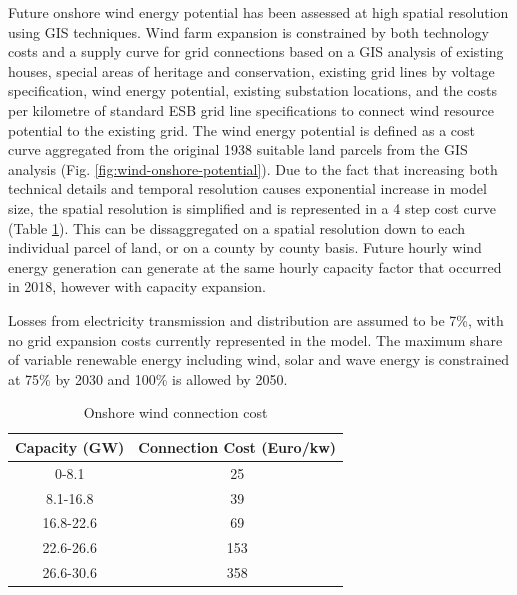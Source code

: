 \documentclass[gmd,manuscript]{copernicus}
\begin{document}
Future onshore wind energy potential has been assessed at high spatial resolution using GIS techniques. Wind farm expansion is constrained by both technology costs and a supply curve for grid connections based on a GIS analysis of existing houses, special areas of heritage and conservation, existing grid lines by voltage specification, wind energy potential, existing substation locations, and the costs per kilometre of standard ESB grid line specifications to connect wind resource potential to the existing grid. The wind energy potential is defined as a cost curve aggregated from the original 1938 suitable land parcels from the GIS analysis (Fig. \ref{fig:wind-onshore-potential}). Due to the fact that increasing both technical details and temporal resolution causes exponential increase in model size, the spatial resolution is simplified and is represented in a 4 step cost curve (Table \ref{onshore-wind-connection-cost}). This can be dissaggregated on a spatial resolution down to each individual parcel of land, or on a county by county basis. Future hourly wind energy generation can generate at the same hourly capacity factor that occurred in 2018, however with capacity expansion.

Losses from electricity transmission and distribution are assumed to be 7\%, with no grid expansion costs currently represented in the model. The maximum share of variable renewable energy including wind, solar and wave energy is constrained at 75\% by 2030 and 100\% is allowed by 2050. 

\begin{table}[ht]
 \centering
 \footnotesize
 \caption{Onshore wind connection cost }
 \begin{tabular}{cc}
 \hline 
 Capacity (GW) & Connection Cost (Euro/kw)\\ 
 \hline
 0-8.1 & 25 \\
 
 8.1-16.8 & 39 \\
 
 16.8-22.6 & 69 \\
 
 22.6-26.6 & 153 \\
 
 26.6-30.6 & 358 \\
 
 \hline
 \end{tabular}
 
 \label{onshore-wind-connection-cost}
\end{table}
\end{document}
